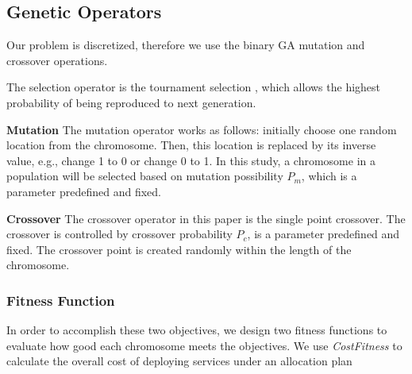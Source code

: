 \documentclass{llncs}
\begin{document}
\subsection{Genetic Operators}
\label{sec:operators}
Our problem is discretized, therefore we use the binary GA mutation and crossover operations.

The selection operator is the tournament selection \cite{Xie:2008:AMI:1389095.1389347}, which allows the highest probability 
of being reproduced to next generation.

\begin{flushleft}\textbf{Mutation} The mutation operator works as follows: initially choose one random location from the chromosome. 
Then, this location is replaced by its inverse value, e.g., change 1 to 0 or change 0 to 1.
In this study, a chromosome in a population will be selected based on mutation possibility $P_{m}$, which is 
a parameter predefined and fixed.
\begin{flushleft}\textbf{Crossover} The crossover operator in this paper is the single point crossover. 
The crossover is controlled by crossover probability $P_{c}$, is a parameter predefined and fixed.
The crossover point is created randomly within the length of the chromosome. 
%
\subsubsection{Fitness Function}
\label{sec:fitness_functions}
\begin{flushleft}In order to accomplish these two objectives, we design two fitness functions to evaluate 
how good each chromosome meets the objectives. We use \emph{CostFitness} to calculate the overall cost of deploying services under an allocation plan\end{flushleft}


\end{flushleft}
\end{flushleft}
\end{document}
